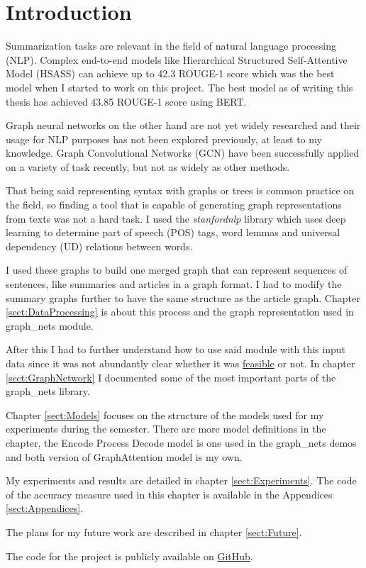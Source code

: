 \chapter*{Introduction}\label{sect:Introduction}

Summarization tasks are relevant in the field of natural language processing (NLP). Complex end-to-end models like Hierarchical Structured Self-Attentive Model (HSASS) \cite{HSSAS} can achieve up to 42.3 ROUGE-1 score which was the best model when I started to work on this project. The best model as of writing this thesis has achieved 43.85 ROUGE-1 score \cite{BERTsum} using BERT.


Graph neural networks on the other hand are not yet widely researched and their usage for NLP purposes has not been explored previously, at least to my knowledge. Graph Convolutional Networks (GCN) have been successfully applied on a variety of task recently, but not as widely as other methods.

That being said representing syntax with graphs or trees is common practice on the field, so finding a tool that is capable of generating graph representations from texts was not a hard task. I used the \textit{stanfordnlp} library which uses deep learning to determine part of speech (POS) tags, word lemmas and universal dependency (UD) relations between words.

I used these graphs to build one merged graph that can represent sequences of sentences, like summaries and articles in a graph format. I had to modify the summary graphs further to have the same structure as the article graph. Chapter \ref{sect:DataProcessing} is about this process and the graph representation used in graph\_nets module.

After this I had to further understand how to use said module with this input data since it was not abundantly clear whether it was \href{https://github.com/deepmind/graph\_nets/issues/36}{feasible} or not. In chapter \ref{sect:GraphNetwork} I documented some of the most important parts of the graph\_nets library.

Chapter \ref{sect:Models} focuses on the structure of the models used for my experiments during the semester. There are more model definitions in the chapter, the Encode Process Decode model is one used in the graph\_nets demos and both version of GraphAttention model is my own.

My experiments and results are detailed in chapter \ref{sect:Experiments}. The code of the accuracy measure used in this chapter is available in the Appendices \ref{sect:Appendices}.

The plans for my future work are described in chapter \ref{sect:Future}.

The code for the project is publicly available on \href{https://github.com/GKingA/graph\_transformations}{GitHub}.